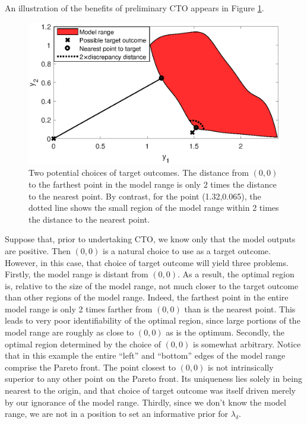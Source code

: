 \documentclass[12pt]{article}
\begin{document}
An illustration of the benefits of preliminary CTO appears in Figure \ref{fig:do_selection_example}.
%
\begin{figure}
\centering
\includegraphics[scale=.8]{FIG_des_obs_selection_example.eps}
\caption{Two potential choices of target outcomes. 
%
The distance from $(0,0)$ to the farthest point in the model range is only 2 times the distance to the nearest point. 
%
By contrast, for the point (1.32,0.065), the dotted line shows the small region of the model range within 2 times the distance to the nearest point.}
\label{fig:do_selection_example}
\end{figure}
%
Suppose that, prior to undertaking CTO, we know only that the model outputs are positive.
%
Then $(0,0)$ is a natural choice to use as a target outcome.
%
However, in this case, that choice of target outcome will yield three problems.
%
Firstly, the model range is distant from $(0,0)$.
%
As a result, the optimal region is, relative to the size of the model range, not much closer to the target outcome than other regions of the model range.
%
Indeed, the farthest point in the entire model range is only 2 times farther from $(0,0)$ than is the nearest point.
%
This leads to very poor identifiability of the optimal region, since large portions of the model range are roughly as close to $(0,0)$ as is the optimum.
%
Secondly, the optimal region determined by the choice of $(0,0)$ is somewhat arbitrary.
%
Notice that in this example the entire ``left'' and ``bottom''  edges of the model range comprise the Pareto front.
%
The point closest to $(0,0)$ is not intrinsically superior to any other point on the Pareto front.
%
Its uniqueness lies solely in being nearest to the origin, and that choice of target outcome was itself driven merely by our ignorance of the model range.
%
Thirdly, since we don't know the model range, we are not in a position to set an informative prior for $\lambda_\delta$.
\end{document}
